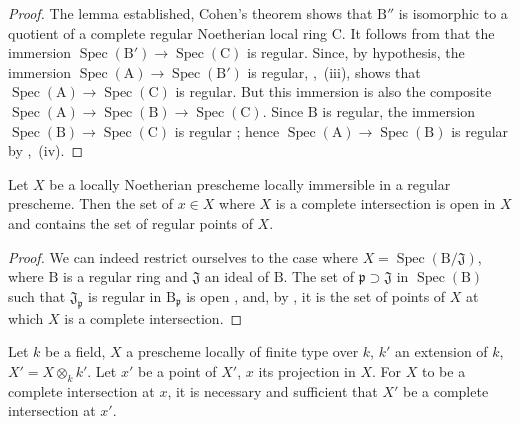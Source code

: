 \begin{proof}
The lemma established, Cohen's theorem  shows that $\mathrm{B}''$ is isomorphic to a quotient of a complete regular Noetherian local ring $\mathrm{C}$.
It follows from  that the immersion $\operatorname{Spec}(\mathrm{B}')\to\operatorname{Spec}(\mathrm{C})$ is regular. Since, by hypothesis, the immersion $\operatorname{Spec}(\mathrm{A})\to\operatorname{Spec}(\mathrm{B}')$ is regular, ,~(iii), shows that $\operatorname{Spec}(\mathrm{A})\to\operatorname{Spec}(\mathrm{C})$ is regular. But this immersion is also the composite $\operatorname{Spec}(\mathrm{A})\longrightarrow\operatorname{Spec}(\mathrm{B})\longrightarrow\operatorname{Spec}(\mathrm{C})$.
Since $\mathrm{B}$ is regular, the immersion $\operatorname{Spec}(\mathrm{B})\to\operatorname{Spec}(\mathrm{C})$ is regular ; hence $\operatorname{Spec}(\mathrm{A})\to\operatorname{Spec}(\mathrm{B})$ is regular by ,~(iv).
\end{proof}

\begin{corollary}[19.3.3]
\label{IV.19.3.3}
Let $X$ be a locally Noetherian prescheme locally immersible in a regular prescheme.
Then the set of $x\in X$ where $X$ is a complete intersection is open in $X$ and contains the set of regular points of $X$.
\end{corollary}

\begin{proof}
We can indeed restrict ourselves to the case where $X=\operatorname{Spec}(\mathrm{B}/\mathfrak{J})$, where $\mathrm{B}$ is a regular ring and $\mathfrak{J}$ an ideal of $\mathrm{B}$.
The set of $\mathfrak{p}\supset\mathfrak{J}$ in $\operatorname{Spec}(\mathrm{B})$ such that $\mathfrak{J}_\mathfrak{p}$ is regular in $\mathrm{B}_\mathfrak{p}$ is open , and, by , it is the set of points of $X$ at which $X$ is a complete intersection.
\end{proof}

\begin{corollary}[19.3.4]
\label{IV.19.3.4}
Let $k$ be a field, $X$ a prescheme locally of finite type over $k$, $k'$ an extension of $k$, $X'=X\otimes_k k'$.
Let $x'$ be a point of $X'$, $x$ its projection in $X$.
For $X$ to be a complete intersection at $x$, it is necessary and sufficient that $X'$ be a complete intersection at $x'$.
\end{corollary}

